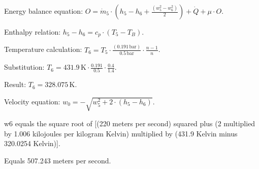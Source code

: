 Energy balance equation:  
\( O = \dot{m}_5 \cdot (h_5 - h_6 + \frac{(w_5^2 - w_6^2)}{2}) + \dot{Q} + \mu \cdot O \).  

Enthalpy relation:  
\( h_5 - h_6 = c_p \cdot (T_5 - T_B) \).  

Temperature calculation:  
\( T_6 = T_5 \cdot \frac{(0.191 \, \text{bar})}{0.5 \, \text{bar}} \cdot \frac{n-1}{n} \).  

Substitution:  
\( T_6 = 431.9 \, \text{K} \cdot \frac{0.191}{0.5} \cdot \frac{0.4}{1.4} \).  

Result:  
\( T_6 = 328.075 \, \text{K} \).  

Velocity equation:  
\( w_0 = -\sqrt{w_5^2 + 2 \cdot (h_5 - h_6)} \).

w6 equals the square root of [(220 meters per second) squared plus (2 multiplied by 1.006 kilojoules per kilogram Kelvin) multiplied by (431.9 Kelvin minus 320.0254 Kelvin)].

Equals 507.243 meters per second.